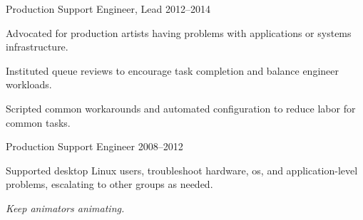 \begin{cventries}
  \cventry
  {Production Support Engineer, Lead}
  {}
  {}
  {2012--2014}
  {
    \begin{cvitems}
    \item {Advocated for production artists having problems with applications or systems infrastructure.}
    \item {Instituted queue reviews to encourage task completion and balance engineer workloads.}
    \item {Scripted common workarounds and automated configuration to reduce labor for common tasks.}
    \end{cvitems}
  }

  \cventry
  {Production Support Engineer}
  {}
  {}
  {2008--2012}
  {
    \begin{cvitems}
    \item {Supported desktop Linux users, troubleshoot hardware, os, and application-level problems, escalating to other groups as needed.}
    \item {\textit{Keep animators animating.}}
    \end{cvitems}
  }

\end{cventries}
